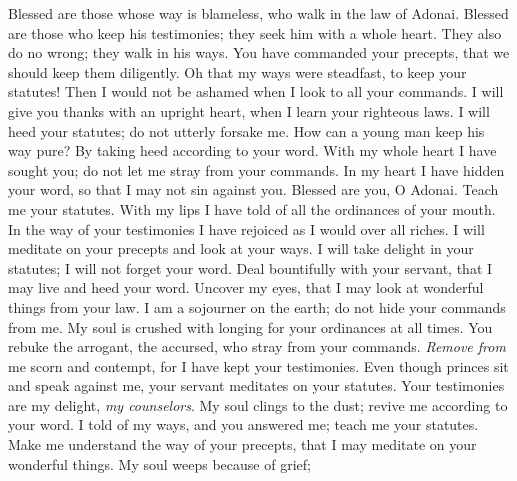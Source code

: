 \begin{biblechapter} %
 Blessed are those whose way is blameless, 
who walk in the law of Adonai.
\verse Blessed are those who keep his testimonies; 
they seek him with a whole heart.
\verse They also do no wrong; 
they walk in his ways.
\verse You have commanded your precepts, 
that we should keep them diligently.
\verse Oh that my ways were steadfast, 
to keep your statutes!
\verse Then I would not be ashamed 
when I look to all your commands.
\verse I will give you thanks with an upright heart, 
when I learn your righteous laws.
\verse I will heed your statutes; 
do not utterly forsake me.
 How can a young man keep his way pure? 
By taking heed according to your word.
\verse With my whole heart I have sought you; 
do not let me stray from your commands.
\verse In my heart I have hidden your word, 
so that I may not sin against you.
\verse Blessed are you, O Adonai. 
Teach me your statutes.
\verse With my lips I have told of 
all the ordinances of your mouth.
\verse In the way of your testimonies I have rejoiced 
as I would over all riches.
\verse I will meditate on your precepts 
and look at your ways.
\verse I will take delight in your statutes; 
I will not forget your word.
 Deal bountifully with your servant, that I may live 
and heed your word.
\verse Uncover my eyes, that I may look at 
wonderful things from your law.
\verse I am a sojourner on the earth; 
do not hide your commands from me.
\verse My soul is crushed with longing 
for your ordinances at all times.
\verse You rebuke the arrogant, the accursed, 
who stray from your commands.
\verse \textit{Remove from} me scorn and contempt, 
for I have kept your testimonies.
\verse Even though princes sit and speak against me, 
your servant meditates on your statutes.
\verse Your testimonies are my delight, 
\textit{my counselors}.
 My soul clings to the dust; 
revive me according to your word.
\verse I told of my ways, and you answered me; 
teach me your statutes.
\verse Make me understand the way of your precepts, 
that I may meditate on your wonderful things.
\verse My soul weeps because of grief; 

\end{biblechapter}
